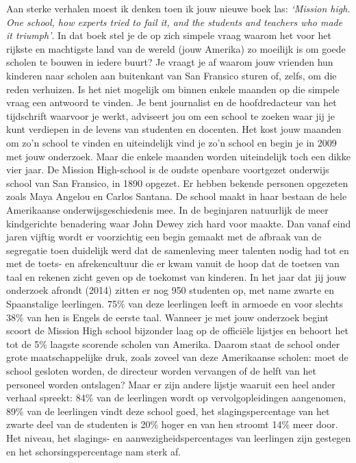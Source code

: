 \documentclass[]{book}
\begin{document}
Aan sterke verhalen moest ik denken toen ik jouw nieuwe boek las:
\emph{`Mission high. One school, how experts tried to fail it, and the
students and teachers who made it triumph'}. In dat boek stel je de op
zich simpele vraag waarom het voor het rijkste en machtigste land van de
wereld (jouw Amerika) zo moeilijk is om goede scholen te bouwen in
iedere buurt? Je vraagt je af waarom jouw vrienden hun kinderen naar
scholen aan buitenkant van San Fransico sturen of, zelfs, om die reden
verhuizen. Is het niet mogelijk om binnen enkele maanden op die simpele
vraag een antwoord te vinden. Je bent journalist en de hoofdredacteur
van het tijdschrift waarvoor je werkt, adviseert jou om een school te
zoeken waar jij je kunt verdiepen in de levens van studenten en
docenten. Het kost jouw maanden om zo'n school te vinden en uiteindelijk
vind je zo'n school en begin je in 2009 met jouw onderzoek. Maar die
enkele maanden worden uiteindelijk toch een dikke vier jaar. De Mission
High-school is de oudste openbare voortgezet onderwijs school van San
Fransico, in 1890 opgezet. Er hebben bekende personen opgezeten zoals
Maya Angelou en Carlos Santana. De school maakt in haar bestaan de hele
Amerikaanse onderwijsgeschiedenis mee. In de beginjaren natuurlijk de
meer kindgerichte benadering waar John Dewey zich hard voor maakte. Dan
vanaf eind jaren vijftig wordt er voorzichtig een begin gemaakt met de
afbraak van de segregatie toen duidelijk werd dat de samenleving meer
talenten nodig had tot en met de toets- en afrekencultuur die er kwam
vanuit de hoop dat de toetsen van taal en rekenen zicht geven op de
toekomst van kinderen. In het jaar dat jij jouw onderzoek afrondt (2014)
zitten er nog 950 studenten op, met name zwarte en Spaanstalige
leerlingen. 75\% van deze leerlingen leeft in armoede en voor slechts
38\% van hen is Engels de eerste taal. Wanneer je met jouw onderzoek
begint scoort de Mission High school bijzonder laag op de officiële
lijstjes en behoort het tot de 5\% laagste scorende scholen van Amerika.
Daarom staat de school onder grote maatschappelijke druk, zoals zoveel
van deze Amerikaanse scholen: moet de school gesloten worden, de
directeur worden vervangen of de helft van het personeel worden
ontslagen? Maar er zijn andere lijstje waaruit een heel ander verhaal
spreekt: 84\% van de leerlingen wordt op vervolgopleidingen aangenomen,
89\% van de leerlingen vindt deze school goed, het slagingspercentage
van het zwarte deel van de studenten is 20\% hoger en van hen stroomt
14\% meer door. Het niveau, het slagings- en aanwezigheidspercentages
van leerlingen zijn gestegen en het schorsingspercentage nam sterk af.
\end{document}
